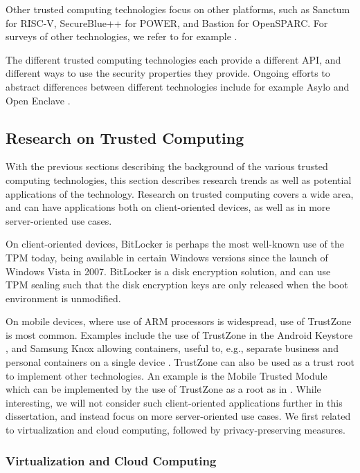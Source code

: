 Other trusted computing technologies focus on other platforms, such as Sanctum \cite{costan:2016b} for RISC-V, SecureBlue++ \cite{boivie:2013} for POWER, and Bastion \cite{champagne:2010} for OpenSPARC.
For surveys of other technologies, we refer to for example \cite{zhang:2016,peters:2017,maene:2018}.

The different trusted computing technologies each provide a different API, and different ways to use the security properties they provide.
Ongoing efforts to abstract differences between different technologies include for example Asylo \cite{asylo} and Open Enclave \cite{openenclave}.

\subsection{Research on Trusted Computing}

With the previous sections describing the background of the various trusted computing technologies, this section describes research trends as well as potential applications of the technology.
Research on trusted computing covers a wide area, and can have applications both on client-oriented devices, as well as in more server-oriented use cases.

On client-oriented devices, BitLocker \cite{Bitlocker} is perhaps the most well-known use of the TPM today, being available in certain Windows versions since the launch of Windows Vista in 2007.
BitLocker is a disk encryption solution, and can use TPM sealing such that the disk encryption keys are only released when the boot environment is unmodified.

On mobile devices, where use of ARM processors is widespread, use of TrustZone is most common.
Examples include the use of TrustZone in the Android Keystore \cite{androidkeystore}, and Samsung Knox allowing containers, useful to, e.g., separate business and personal containers on a single device \cite{kanonov:2016}.
TrustZone can also be used as a trust root to implement other technologies.
An example is the Mobile Trusted Module which can be implemented by the use of TrustZone as a root as in \cite{winter:2008}.
While interesting, we will not consider such client-oriented applications further in this dissertation, and instead focus on more server-oriented use cases.
We first related to virtualization and cloud computing, followed by privacy-preserving measures.

\subsubsection{Virtualization and Cloud Computing}

